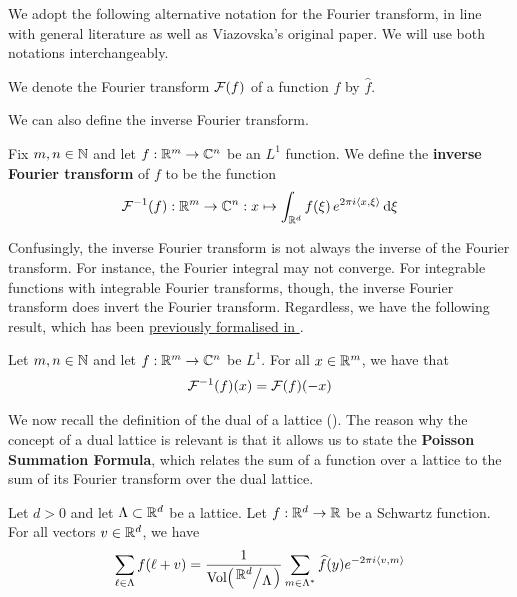 We adopt the following alternative notation for the Fourier transform, in line with general literature as well as Viazovska's original paper. We will use both notations interchangeably.

\begin{boxnotation}
    We denote the Fourier transform $\mathcal{F}(f)$ of a function $f$ by $\hat{f}$.
\end{boxnotation}

We can also define the inverse Fourier transform.

\begin{boxdefinition}
    Fix $m, n \in \mathbb{N}$ and let $f : \mathbb{R}^m \to \mathbb{C}^n$ be an $L^1$ function. We define the \textbf{inverse Fourier transform} of $f$ to be the function
    \begin{align*}
         \mathcal{F}^{-1}(f) : \mathbb{R}^m \to \mathbb{C}^n : x \mapsto \int_{\mathbb{R}^d} f\!\left( \xi \right) e^{2 \pi i \left\langle x, \xi \right\rangle} \operatorname{d}\!{\xi}
    \end{align*}
\end{boxdefinition}

Confusingly, the inverse Fourier transform is not always the inverse of the Fourier transform. For instance, the Fourier integral may not converge. For integrable functions with integrable Fourier transforms, though, the inverse Fourier transform does invert the Fourier transform. Regardless, we have the following result, which has been \href{https://github.com/leanprover-community/mathlib4/blob/6c6e0180f0d3dc9f47f85532f48d268d8656789a/Mathlib/Analysis/Fourier/FourierTransform.lean#L405-L410}{previously formalised in \mathlib}.

\begin{boxlemma}\label{Ch2:Lemma:Fourier_Inverse_Fourier_Neg}
    Let $m, n \in \mathbb{N}$ and let $f : \mathbb{R}^m \to \mathbb{C}^n$ be $L^1$. For all $x \in \mathbb{R}^m$, we have that
    \begin{align*}
        \mathcal{F}^{-1}\!\left( f \right)\!\left( x \right) = \mathcal{F}\!\left( f \right)\!\left( -x \right)
    \end{align*}
\end{boxlemma}

We now recall the definition of the dual of a lattice (). The reason why the concept of a dual lattice is relevant is that it allows us to state the \textbf{Poisson Summation Formula}, which relates the sum of a function over a lattice to the sum of its Fourier transform over the dual lattice.

\begin{boxtheorem}\label{Ch2:Thm:Poisson_Summation}
    Let $d > 0$ and let $\Lambda \subset \mathbb{R}^d$ be a lattice. Let $f : \mathbb{R}^d \to \mathbb{R}$ be a Schwartz function. For all vectors $v \in \mathbb{R}^d$, we have
    \begin{align*}
        \sum_{\ell \in \Lambda} \fof{\ell + v} = \frac{1}{\Volof{\quotient{\R^d}{\Lambda}}} \sum_{m \in \Lambda^*} \hat{f}(y) e^{-2\pi i \cycl{v, m}}
    \end{align*}
\end{boxtheorem}

